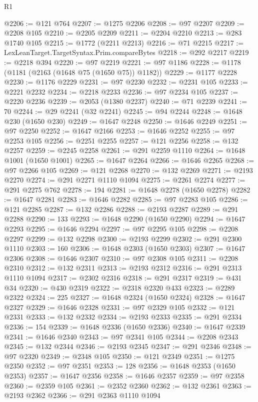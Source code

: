 \begin{lexlean}{R1}
\begin{coremodule}
@2206 := @121 @764
@2207 := @1275 @2206
@2208 := @97 @2207
@2209 := @2208 @105
@2210 := @2205 @2209
@2211 := @2204 @2210
@2213 := @283 @1740 @105
@2215 := @1772 (@2211 @2213)
@2216 := @71 @2215
@2217 := LexLeanTarget.TargetSyntax.Prim.compareBytes
@2218 := @292 @2217
@2219 := @2218 @394
@2220 := @97 @2219
@2221 := @97 @1186
@2228 := @1178 (@1181 (@2163 (@1648 @75 (@1650 @75)) @1182))
@2229 := @1177 @2228
@2230 := @1176 @2229
@2231 := @97 @2230
@2232 := @2231 @105
@2233 := @2221 @2232
@2234 := @2218 @2233
@2236 := @97 @2234 @105
@2237 := @2220 @2236
@2239 := @2053 (@1380 @2237)
@2240 := @71 @2239
@2241 := 70
@2244 := @29 @2241 (@32 @2241)
@2245 := @94 @2244
@2248 := @1648 @230 (@1650 @230)
@2249 := @1647 @2248
@2250 := @1646 @2249
@2251 := @97 @2250
@2252 := @1647 @2166
@2253 := @1646 @2252
@2255 := @97 @2253 @105
@2256 := @2251 @2255
@2257 := @121 @2256
@2258 := @132 @2257
@2259 := @2245 @2258
@2261 := @291 @2259 @1110
@2264 := @1648 @1001 (@1650 @1001)
@2265 := @1647 @2264
@2266 := @1646 @2265
@2268 := @97 @2266 @105
@2269 := @121 @2268
@2270 := @132 @2269
@2271 := @2193 @2270
@2274 := @291 @2271 @1110 @1094
@2275 := @2261 @2274
@2277 := @291 @2275 @762
@2278 := 194
@2281 := @1648 @2278 (@1650 @2278)
@2282 := @1647 @2281
@2283 := @1646 @2282
@2285 := @97 @2283 @105
@2286 := @121 @2285
@2287 := @132 @2286
@2288 := @2193 @2287
@2289 := @291 @2288
@2290 := 133
@2293 := @1648 @2290 (@1650 @2290)
@2294 := @1647 @2293
@2295 := @1646 @2294
@2297 := @97 @2295 @105
@2298 := @2208 @2297
@2299 := @132 @2298
@2300 := @2193 @2299
@2302 := @291 @2300 @1110
@2303 := 160
@2306 := @1648 @2303 (@1650 @2303)
@2307 := @1647 @2306
@2308 := @1646 @2307
@2310 := @97 @2308 @105
@2311 := @2208 @2310
@2312 := @132 @2311
@2313 := @2193 @2312
@2316 := @291 @2313 @1110 @1094
@2317 := @2302 @2316
@2318 := @291 @2317
@2319 := @431 @34
@2320 := @430 @2319
@2322 := @2318 @2320 @433
@2323 := @2289 @2322
@2324 := 225
@2327 := @1648 @2324 (@1650 @2324)
@2328 := @1647 @2327
@2329 := @1646 @2328
@2331 := @97 @2329 @105
@2332 := @121 @2331
@2333 := @132 @2332
@2334 := @2193 @2333
@2335 := @291 @2334
@2336 := 154
@2339 := @1648 @2336 (@1650 @2336)
@2340 := @1647 @2339
@2341 := @1646 @2340
@2343 := @97 @2341 @105
@2344 := @2208 @2343
@2345 := @132 @2344
@2346 := @2193 @2345
@2347 := @291 @2346
@2348 := @97 @2320
@2349 := @2348 @105
@2350 := @121 @2349
@2351 := @1275 @2350
@2352 := @97 @2351
@2353 := 128
@2356 := @1648 @2353 (@1650 @2353)
@2357 := @1647 @2356
@2358 := @1646 @2357
@2359 := @97 @2358
@2360 := @2359 @105
@2361 := @2352 @2360
@2362 := @132 @2361
@2363 := @2193 @2362
@2366 := @291 @2363 @1110 @1094

\end{coremodule}
\end{lexlean}
